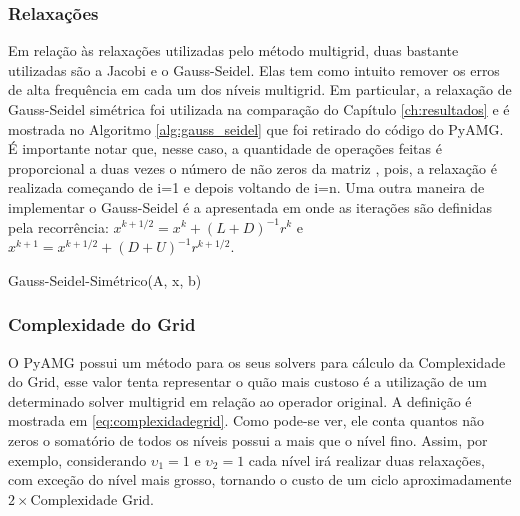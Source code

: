 \subsubsection{Relaxações}


Em relação às relaxações utilizadas pelo método multigrid, duas bastante utilizadas são a Jacobi e o Gauss-Seidel. Elas tem como intuito remover os erros de alta frequência em cada um dos níveis multigrid. Em particular, a relaxação de Gauss-Seidel simétrica foi utilizada na comparação do Capítulo \ref{ch:resultados} e é mostrada no Algoritmo \ref{alg:gauss_seidel} que foi retirado do código do PyAMG. É importante notar que, nesse caso, a quantidade de operações feitas é proporcional a duas vezes o número de não zeros da matriz , pois, a relaxação é realizada começando de i=1 e depois voltando de i=n. Uma outra maneira de implementar o Gauss-Seidel é a apresentada em \cite{solverlinear} onde as iterações são definidas pela recorrência: $x^{k+1/2}=x^k+(L+D)^{-1}r^k$ e $x^{k+1}=x^{k+1/2}+(D+U)^{-1}r^{k+1/2}$.


\vspace{1cm}

\begin{algorithm}[H]
\caption{Gauss-Seidel-Simétrico(A, x, b)}
\label{alg:gauss_seidel}
\end{algorithm}

\vspace{1cm}


\subsubsection{Complexidade do Grid}
 
O PyAMG possui um método para os seus solvers para cálculo da  Complexidade do Grid, esse valor tenta representar o quão mais custoso é a utilização de um determinado solver multigrid em relação ao operador original. A definição é mostrada em \eqref{eq:complexidadegrid}. Como pode-se ver, ele conta quantos não zeros o somatório de todos os níveis possui a mais que o nível fino. Assim, por exemplo, considerando $\upsilon_1=1$ e $\upsilon_2=1$ cada nível irá realizar duas relaxações, com exceção do nível mais grosso, tornando o  custo de um ciclo aproximadamente $2\times\text{Complexidade Grid}$. 

